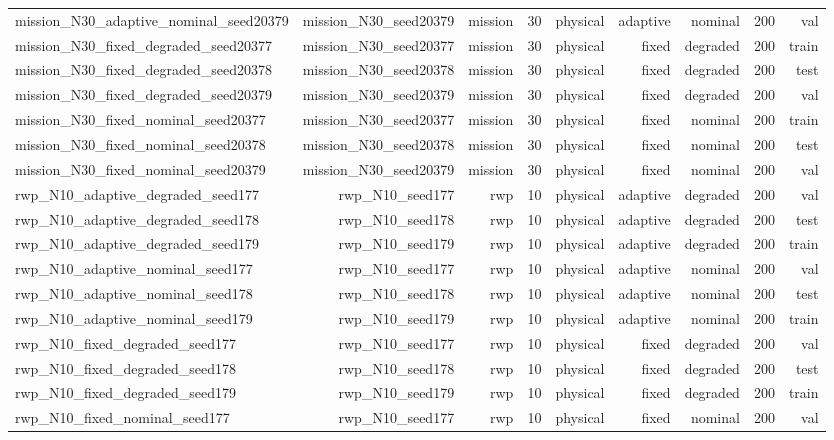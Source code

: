 \begin{tabular}{lrrrrrrrr}
mission\_N30\_adaptive\_nominal\_seed20379 & mission\_N30\_seed20379 & mission & 30 & physical & adaptive & nominal & 200 & val \\
mission\_N30\_fixed\_degraded\_seed20377 & mission\_N30\_seed20377 & mission & 30 & physical & fixed & degraded & 200 & train \\
mission\_N30\_fixed\_degraded\_seed20378 & mission\_N30\_seed20378 & mission & 30 & physical & fixed & degraded & 200 & test \\
mission\_N30\_fixed\_degraded\_seed20379 & mission\_N30\_seed20379 & mission & 30 & physical & fixed & degraded & 200 & val \\
mission\_N30\_fixed\_nominal\_seed20377 & mission\_N30\_seed20377 & mission & 30 & physical & fixed & nominal & 200 & train \\
mission\_N30\_fixed\_nominal\_seed20378 & mission\_N30\_seed20378 & mission & 30 & physical & fixed & nominal & 200 & test \\
mission\_N30\_fixed\_nominal\_seed20379 & mission\_N30\_seed20379 & mission & 30 & physical & fixed & nominal & 200 & val \\
rwp\_N10\_adaptive\_degraded\_seed177 & rwp\_N10\_seed177 & rwp & 10 & physical & adaptive & degraded & 200 & val \\
rwp\_N10\_adaptive\_degraded\_seed178 & rwp\_N10\_seed178 & rwp & 10 & physical & adaptive & degraded & 200 & test \\
rwp\_N10\_adaptive\_degraded\_seed179 & rwp\_N10\_seed179 & rwp & 10 & physical & adaptive & degraded & 200 & train \\
rwp\_N10\_adaptive\_nominal\_seed177 & rwp\_N10\_seed177 & rwp & 10 & physical & adaptive & nominal & 200 & val \\
rwp\_N10\_adaptive\_nominal\_seed178 & rwp\_N10\_seed178 & rwp & 10 & physical & adaptive & nominal & 200 & test \\
rwp\_N10\_adaptive\_nominal\_seed179 & rwp\_N10\_seed179 & rwp & 10 & physical & adaptive & nominal & 200 & train \\
rwp\_N10\_fixed\_degraded\_seed177 & rwp\_N10\_seed177 & rwp & 10 & physical & fixed & degraded & 200 & val \\
rwp\_N10\_fixed\_degraded\_seed178 & rwp\_N10\_seed178 & rwp & 10 & physical & fixed & degraded & 200 & test \\
rwp\_N10\_fixed\_degraded\_seed179 & rwp\_N10\_seed179 & rwp & 10 & physical & fixed & degraded & 200 & train \\
rwp\_N10\_fixed\_nominal\_seed177 & rwp\_N10\_seed177 & rwp & 10 & physical & fixed & nominal & 200 & val \\

\end{tabular}
